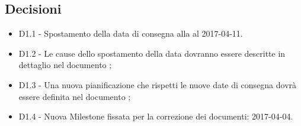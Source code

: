 \documentclass[a4paper,titlepage]{article}
\begin{document}
 \subsection{Decisioni}
 \begin{itemize}
 \item D1.1 - Spostamento della data di consegna alla \RP{} al 2017-04-11.
 \item D1.2 - Le cause dello spostamento della data dovranno essere descritte in dettaglio nel documento \PPdocRP{};
  \item D1.3 - Una nuova pianificazione che rispetti le nuove date di consegna dovrà essere definita nel documento \PPdocRP{};
  \item D1.4 - Nuova Milestone fissata per la correzione dei documenti: 2017-04-04.
 \end{itemize}
\end{document}
